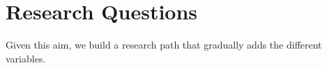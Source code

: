 








\section{\statusgreen Research Questions}
\label{sec:intro_rqs}

Given this aim, we build a research path that gradually adds the different variables.

